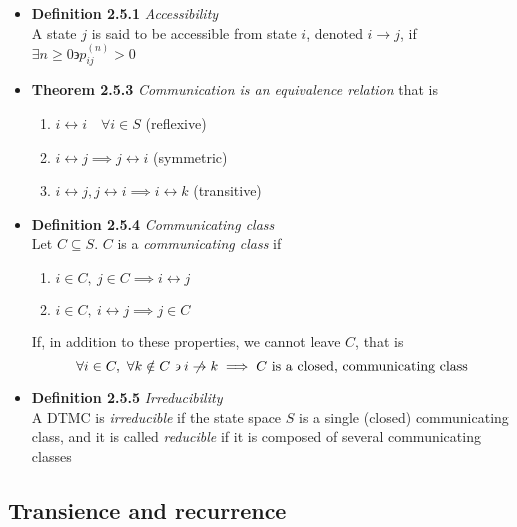\documentclass[11pt,a4paper]{article}
\begin{document}
\begin{itemize}

    \item \textbf{Definition 2.5.1} \emph{Accessibility} \\
        A state $j$ is said to be accessible from state $i$, denoted $i \rightarrow j$, if
        $\exists n \geq 0 \backepsilon p_{ij}^{(n)} > 0$
    \item \textbf{Theorem 2.5.3} \emph{Communication is an equivalence relation}
        that is
        \begin{enumerate}
            \item $i \leftrightarrow i \quad \forall i \in S$ (reflexive)
            \item $i \leftrightarrow j \implies j \leftrightarrow i$ (symmetric)
            \item $i \leftrightarrow j, j \leftrightarrow i \implies i \leftrightarrow k$
                (transitive)
        \end{enumerate}
    \item \textbf{Definition 2.5.4} \emph{Communicating class} \\
        Let $C \subseteq S$. $C$ is a \emph{communicating class} if
        \begin{enumerate}
            \item $i \in C,\ j \in C \implies i \leftrightarrow j$
            \item $i \in C,\ i \leftrightarrow j \implies j \in C$
        \end{enumerate}
        If, in addition to these properties, we cannot leave $C$, that is
        \[
            \forall i \in C,\ \forall k \notin C \backepsilon i \centernot\rightarrow k
            \implies C \text{ is a closed, communicating class}
        \]
    \item \textbf{Definition 2.5.5} \emph{Irreducibility} \\
        A DTMC is \emph{irreducible} if the state space $S$ is a single (closed)
        communicating class, and it is called \emph{reducible} if it is composed of several
        communicating classes

\end{itemize}

\subsection{Transience and recurrence}
\end{document}
